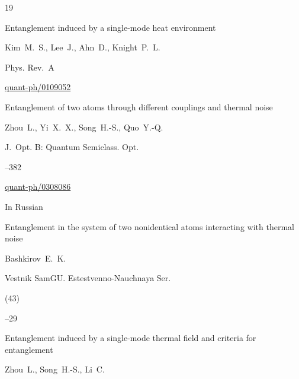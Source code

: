 \begin{thebibliography}{19}

\paper  Entanglement induced by a single-mode heat environment 

\by   Kim~M.~S.,  Lee~J.,  Ahn~D.,  Knight~P.~L.

\jour Phys.  Rev.~A






\arxiv \href{http://arxiv.org/abs/quant-ph/0109052}{quant-ph/0109052}




\paper  Entanglement of two atoms through different couplings and thermal noise 

\by  Zhou~L., Yi~X.~X., Song~H.-S., Quo~Y.-Q.

\jour J.~Opt. B: Quantum Semiclass. Opt. 




--382


\arxiv \href{http://arxiv.org/abs/quant-ph/0308086}{quant-ph/0308086}










\lang In Russian

\paper Entanglement in the system of two nonidentical atoms interacting with thermal noise

\by   Bashkirov~E.~K.

\jour Vestnik SamGU. Estestvenno-Nauchnaya Ser.


(43) 

--29






\paper Entanglement induced by a single-mode thermal field and criteria for entanglement

\by  Zhou~L.,  Song~H.-S., Li~C.


\end{thebibliography}
